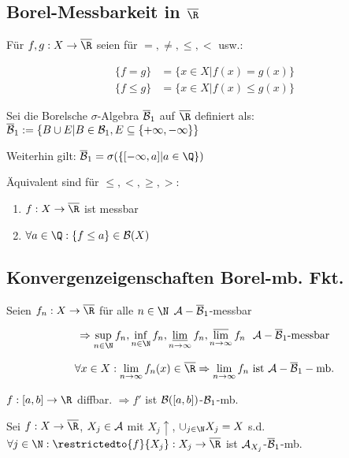 \subsection*{Borel-Messbarkeit in $\overline \R$}

Für $f, g : X \to \overline \R$ seien für $=, \neq, \leq, <$ usw.:

\vspace{-4mm}
\begin{align*}
	\{ f = g \} &= \{ x \in X | f(x) = g(x) \}\\
	\{ f \leq g \} &= \{ x \in X | f(x) \leq g(x) \}
\end{align*}

Sei die Borelsche $\sigma$-Algebra $\overline {\mathcal{B}}_1$ auf $\overline \R$ definiert als: $\overline {\mathcal{B}}_1 := \{ B \cup E | B \in \mathcal{B}_1, E \subseteq \{+\infty, -\infty\} \}$

Weiterhin gilt: $\overline \B_1 = \sigma(\{ [-\infty,a] | a \in \Q \})$

Äquivalent sind für $\leq, <, \geq, >$:

\begin{enumerate}[label=(\alph*)]
	\item $f: X \to \overline \R$ ist messbar
	\item $\forall a \in \Q : \{f \leq a\} \in \B(X)$
\end{enumerate}

\subsection*{Konvergenzeigenschaften Borel-mb. Fkt.}

Seien $f_n : X \to \overline \R$ für alle $n \in \N$ $\mathcal{A}-\overline {\mathcal{B}}_1$-messbar

\vspace{-4mm}
$$\Rightarrow \sup_{n \in \N} f_n, \inf_{n \in \N} f_n, \varliminf_{n \to \infty} f_n, \varlimsup_{n \to \infty} f_n \ \ \A-\overline \B_1 \text{-messbar}$$

\vspace{-4mm}
$$\forall x \in X : \lim_{n \to \infty} f_n(x) \in \overline \R \Rightarrow \lim_{n \to \infty} f_n \text{ ist } \A-\overline \B_1-\text{mb.}$$

$f : [a,b] \to \R$ diffbar. $\Rightarrow f'$ ist $\mathcal{B}([a,b])$-$\mathcal{B}_1$-mb.

\vspace{2mm}

Sei $f : X \to \overline \R$, $X_j \in \mathcal{A}$ mit $X_j \uparrow$, $\cup_{j \in \N} X_j = X$ s.d. $\forall j \in \N : \restrictedto{f}{X_j} : X_j \to \overline \R$ ist $\mathcal{A}_{X_j}$-$\overline {\mathcal{B}}_1$-mb.

